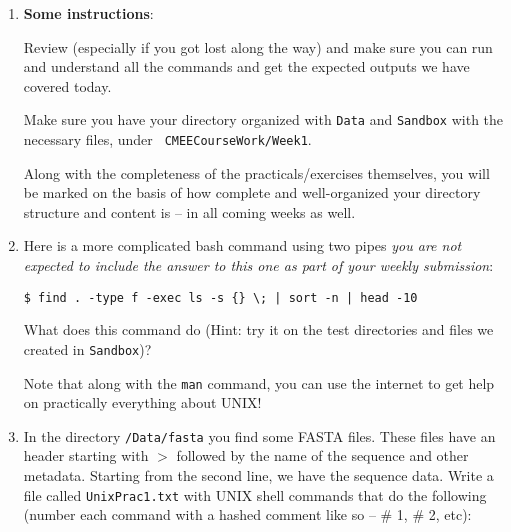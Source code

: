  \begin{enumerate} \itemsep10pt
		
		\item {\bf Some instructions}: 
		
		Review (especially if you got lost along the way) and make 
		sure you can run and understand all the commands and get the 
		expected outputs we have covered today. 
		
		Make sure you have your directory organized with {\tt Data} 
		and {\tt Sandbox} with the necessary files, under {\tt 
		CMEECourseWork/Week1}.

		Along with the completeness of the practicals/exercises 
		themselves, you will be marked on the basis of how complete and 
		well-organized your directory structure and content is -- in all 
		coming weeks as well.

	\item Here is a more complicated bash command using two pipes {\it you 
	are not expected to include the answer to this one as part of your 
	weekly submission}:
	
\begin{lstlisting}
$ find . -type f -exec ls -s {} \; | sort -n | head -10
\end{lstlisting}



	What does this command do (Hint: try it on the test directories and 
	files we created in {\tt Sandbox})?
		
	Note that along with the {\tt man} command, you can use the internet 
	 to get help on practically everything about UNIX!

\item In the directory {\tt /Data/fasta} you find some FASTA files. 
These files have an header starting with $>$ followed by the name of 
the sequence and other metadata. Starting from the second line, we have 
the sequence data. Write a file called {\tt UnixPrac1.txt} with UNIX 
shell commands that do the following (number each command with a hashed 
comment like so -- \# 1, \# 2, etc):


\end{enumerate}
